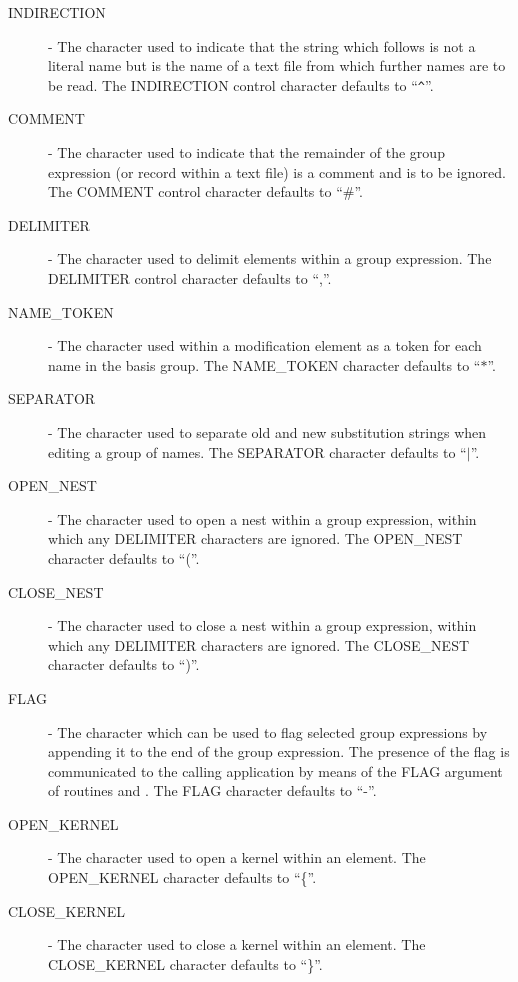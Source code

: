\begin{description}
\item [INDIRECTION] - The character used to indicate that the string which
follows is not a literal name but is the name of a text file from which further
names are to be read. The INDIRECTION control character defaults to
``\verb+^+''.

\item [COMMENT] - The character used to indicate that the remainder of the group
expression (or record within a text file) is a comment and is to be ignored.
The COMMENT control character defaults to ``\#''.

\item [DELIMITER] - The character used to delimit elements within a group
expression. The DELIMITER control character defaults to ``,''.

\item [NAME\_TOKEN] - The character used within a modification element as a
token for each name in the basis group. The NAME\_TOKEN character defaults to
``$*$''.

\item [SEPARATOR] - The character used to separate old and new substitution
strings when editing a group of names. The SEPARATOR character defaults to
``$\mid$''.

\item [OPEN\_NEST] - The character used to open a nest within a group
expression, within which any DELIMITER characters are ignored. The OPEN\_NEST
character defaults to ``(''.

\item [CLOSE\_NEST] - The character used to close a nest within a group
expression, within which any DELIMITER characters are ignored. The CLOSE\_NEST
character defaults to ``)''.

\item [FLAG] - The character which can be used to flag selected group
expressions by appending it to the end of the group expression. The presence of
the flag is communicated to the calling application by means of the FLAG
argument of routines  and . The FLAG character defaults
to ``-''.

\item [OPEN\_KERNEL] - The character used to open a kernel within an element.
The OPEN\_KERNEL character defaults to ``\{''.

\item [CLOSE\_KERNEL] - The character used to close a kernel within an element.
The CLOSE\_KERNEL character defaults to ``\}''.


\end{description}
